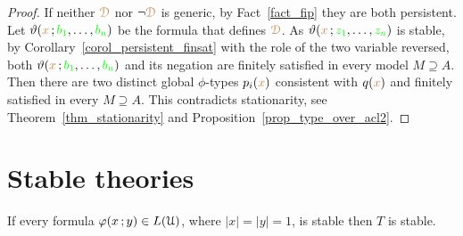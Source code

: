 \begin{proof}
  If neither ${\color{brown}\EuScript D}$ nor $\neg{\color{brown}\EuScript D}$ is generic, by Fact~\ref{fact_fip} they are both persistent.
  Let $\vartheta({\color{brown} x}\,;{\color{green} b_1},\dots,{\color{green} b_n})$ be the formula that defines ${\color{brown}\EuScript D}$.
  As $\vartheta({\color{brown} x}\,;{\color{green} z_1},\dots,{\color{green} z_n})$ is stable, by Corollary~\ref{corol_persistent_finsat} with the role of the two variable reversed, both $\vartheta({\color{brown} x}\,;{\color{green} b_1},\dots,{\color{green} b_n})$ and its negation are finitely satisfied in every model $M\supseteq A$.
  Then there are two distinct global $\phi$-types $p_i({\color{brown} x})$ consistent with $q({\color{brown} x})$ and finitely satisfied in every $M\supseteq A$.
  This contradicts stationarity, see Theorem~\ref{thm_stationarity} and Proposition~\ref{prop_type_over_acl2}.
\end{proof}


\section{Stable theories}
\label{stable_theories}

\begin{theorem}
  If every formula $\varphi(x\,;y)\in L(\EuScript U)$, where $|x|=|y|=1$, is stable then $T$ is stable.
\end{theorem} 


